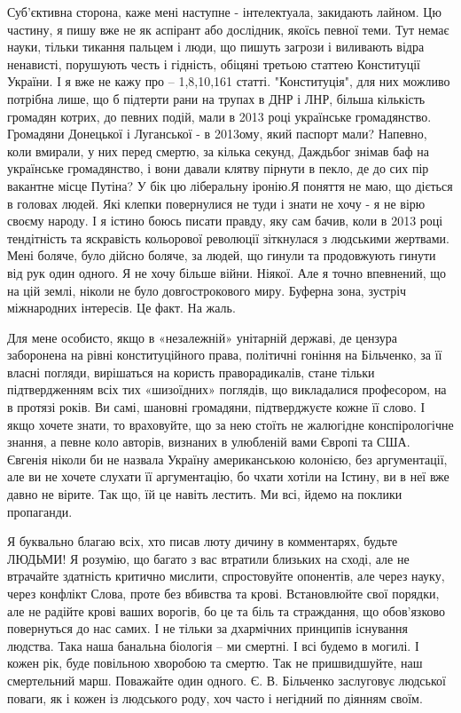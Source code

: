 Суб'єктивна сторона, каже мені наступне - інтелектуала, закидають лайном. Цю
частину, я пишу вже не як аспірант або дослідник, якоїсь певної теми. Тут немає
науки, тільки тикання пальцем і люди, що пишуть загрози і виливають відра
ненависті, порушують честь і гідність, обіцяні  третьою статтею  Конституції
України. І я вже не кажу про – 1,8,10,161 статті. "Конституція", для них
можливо потрібна лише, що б підтерти рани на трупах в ДНР і ЛНР, більша
кількість громадян котрих, до певних подій, мали в 2013 році українське
громадянство. Громадяни Донецької і Луганської - в 2013ому, який паспорт мали?
Напевно, коли вмирали, у них перед смертю, за кілька секунд, Даждьбог знімав
баф на українське громадянство, і вони давали клятву пірнути в пекло, де до сих
пір вакантне місце Путіна? У бік цю ліберальну іронію.Я поняття не маю, що
діється в головах людей. Які клепки повернулися не туди і знати не хочу - я не
вірю своєму народу. І я істино боюсь писати правду, яку сам бачив, коли в 2013
році тендітність та яскравість кольорової революції зіткнулася з людськими
жертвами. Мені боляче, було дійсно боляче, за людей, що гинули та продовжують
гинути від рук один одного. Я не хочу більше війни. Ніякої. Але я точно
впевнений, що на цій землі, ніколи не було довгострокового миру. Буферна зона,
зустріч міжнародних інтересів. Це факт. На жаль.  

Для мене особисто, якщо в «незалежній» унітарній державі, де цензура заборонена
на рівні конституційного права, політичні гоніння на Більченко, за її власні
погляди, вирішаться на користь праворадикалів, стане тільки підтвердженням всіх
тих «шизоїдних» поглядів, що викладалися професором, на в протязі років. Ви
самі, шановні громадяни, підтверджуєте кожне її слово. І якщо хочете знати, то
враховуйте, що за нею стоїть не жалюгідне конспірологічне знання, а певне коло
авторів, визнаних в улюбленій вами Європі та США. Євгенія ніколи би не назвала
Україну американською колонією, без аргументації, але ви не хочете слухати її
аргументацію, бо чхати хотіли на Істину, ви в неї вже давно не вірите.  Так що,
їй це навіть лестить. Ми всі, йдемо на поклики пропаганди. 

Я буквально благаю всіх, хто писав люту дичину в комментарях, будьте ЛЮДЬМИ! Я
розумію, що багато з вас втратили близьких на сході, але не втрачайте здатність
критично мислити, спростовуйте опонентів, але через науку, через конфлікт
Слова, проте без вбивства та крові. Встановлюйте свої порядки, але не радійте
крові ваших ворогів, бо це та біль та страждання, що обов’язково повернуться до
нас самих. І не тільки за дхармічних принципів існування людства. Така наша
банальна біологія – ми смертні. І всі будемо в могилі.  І кожен рік, буде
повільною хворобою та смертю. Так не пришвидшуйте, наш смертельний марш.
Поважайте один одного. Є. В. Більченко заслуговує людської поваги, як і кожен із
людського роду, хоч часто і негідний по діянням своїм. 

